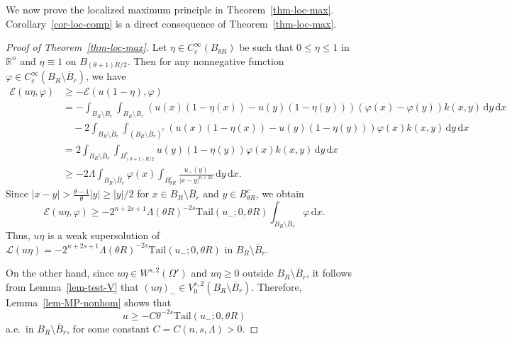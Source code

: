 \documentclass[11pt]{amsart}
\theoremstyle{plain}
\theoremstyle{definition}
\numberwithin{equation}{section}
\begin{document}
We now prove the localized maximum principle in Theorem~\ref{thm-loc-max}. Corollary~\ref{cor-loc-comp} is a direct consequence of Theorem~\ref{thm-loc-max}.

\begin{proof}[Proof of Theorem~\ref{thm-loc-max}]
Let $\eta \in C^\infty_c(B_{\theta R})$ be such that $0 \leq \eta \leq 1$ in $\mathbb{R}^n$ and $\eta \equiv 1$ on $B_{(\theta+1)R/2}$. Then for any nonnegative function $\varphi \in C^\infty_c(B_R \setminus \overline{B}_r)$, we have
\begin{align*}
\mathcal{E}(u\eta, \varphi)
&\geq - \mathcal{E}(u(1-\eta), \varphi) \\
&= - \int_{B_R \setminus \overline{B}_r} \int_{B_R \setminus \overline{B}_r} (u(x)(1-\eta(x)) - u(y)(1-\eta(y)))(\varphi(x) -\varphi(y)) k(x, y)\,\mathrm{d}y \,\mathrm{d}x \\
&\quad - 2 \int_{B_R \setminus \overline{B}_r} \int_{(B_R \setminus \overline{B}_r)^c} (u(x)(1-\eta(x)) - u(y)(1-\eta(y))) \varphi(x) k(x, y) \,\mathrm{d}y \,\mathrm{d}x \\
&= 2 \int_{B_R \setminus \overline{B}_r} \int_{B_{(\theta+1)R/2}^c} u(y)(1-\eta(y))\varphi(x) k(x, y) \,\mathrm{d}y \,\mathrm{d}x \\
&\geq -2\Lambda \int_{B_R \setminus \overline{B}_r} \varphi(x) \int_{B_{\theta R}^c} \frac{u_-(y)}{|x-y|^{n+2s}} \,\mathrm{d}y \,\mathrm{d}x.
\end{align*}
Since $|x-y| > \frac{\theta-1}{\theta}|y| \geq |y|/2$ for $x \in B_R \setminus \overline{B}_r$ and $y \in B_{\theta R}^c$, we obtain
\begin{equation*}
\mathcal{E}(u\eta, \varphi) \geq -2^{n+2s+1} \Lambda (\theta R)^{-2s} \mathrm{Tail}(u_-; 0, \theta R) \int_{B_R \setminus \overline{B}_r} \varphi \,\mathrm{d}x.
\end{equation*}
Thus, $u\eta$ is a weak supersolution of $\mathcal{L}(u\eta) = -2^{n+2s+1}\Lambda (\theta R)^{-2s} \mathrm{Tail}(u_-; 0, \theta R)$ in $B_R \setminus \overline{B}_r$.

On the other hand, since $u\eta \in W^{s, 2}(\Omega')$ and $u\eta \geq 0$ outside $B_R \setminus \overline{B}_r$, it follows from Lemma~\ref{lem-test-V} that $(u\eta)_- \in V^{s, 2}_0(B_R \setminus \overline{B}_r)$. Therefore, Lemma~\ref{lem-MP-nonhom} shows that
\begin{equation*}
u \geq -C \theta^{-2s} \mathrm{Tail}(u_-; 0, \theta R)
\end{equation*}
a.e.\ in $B_R \setminus \overline{B}_r$, for some constant $C=C(n, s, \Lambda)>0$.
\end{proof}
\end{document}

